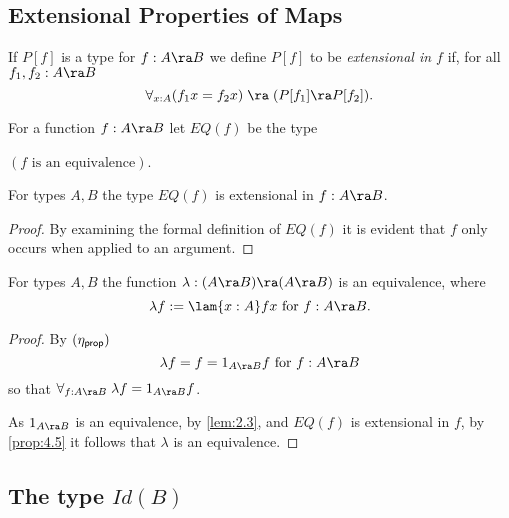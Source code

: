 \subsection{Extensional Properties of Maps}
\begin{defn}
If $P[f]$ is a type for $f:A\ra B$ we define $P[f]$ to be {\em extensional in $f$} if, for all $f_1,f_2:A\ra B$
  \[ \forall_{x:A}(f_1x=f_2x)\;\ra\; (P[f_1]\ra P[f_2]).\]
\end{defn} 
\begin{defn} For a function $f:A\ra B$ let $EQ(f)$ be the type 
\begin{center}
{\em $(f\mbox{ is an equivalence})$}.
\end{center}
\end{defn}
\begin{thm}\label{prop:4.5}
For types $A,B$ the type $EQ(f)$ is extensional in $f:A\ra B$.
\end{thm}
\begin{proof}  By examining the formal definition of $EQ(f)$ it is evident that $f$ only occurs when applied to an argument.
\end{proof}

\begin{cor} \label{cor:4.6}
For types $A,B$ the function $\lambda:(A\ra B)\ra(A\ra B)$ is an equivalence, where 
  \[ \lambda f := \lam{x:A} fx\mbox{ for } f:A\ra B.\]
\end{cor}
\begin{proof} By $(\eta_{\sf prop})$
  \[ \lambda f = f = 1_{A\ra B}f\mbox{ for } f:A\ra B\]
so that $\forall_{f:A\ra B}\; \lambda f=1_{A\ra B}f$.

As $1_{A\ra B}$ is an equivalence, by \autoref{lem:2.3}, and $EQ(f)$ is extensional in $f$, by \autoref{prop:4.5} it follows that $\lambda$ is an equivalence.
\end{proof}

\subsection{The type $Id(B)$}

